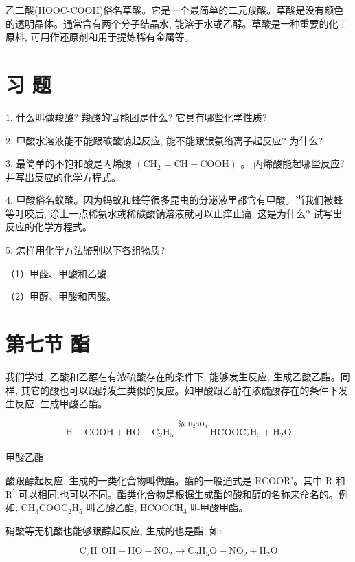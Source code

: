 \documentclass[10pt]{article}
\begin{document}
乙二酸(HOOC-COOH)俗名草酸。它是一个最简单的二元羧酸。草酸是没有颜色的透明晶体。通常含有两个分子结晶水, 能溶于水或乙醇。草酸是一种重要的化工原料, 可用作还原剂和用于提炼稀有金属等。

\section*{习 题}

1. 什么叫做羧酸? 羧酸的官能团是什么? 它具有哪些化学性质?

2. 甲酸水溶液能不能跟碳酸钠起反应, 能不能跟银氨络离子起反应? 为什么?

3. 最简单的不饱和酸是丙烯酸 \(\left( {{\mathrm{{CH}}}_{2} = \mathrm{{CH}} - \mathrm{{COOH}}}\right)\) 。 丙烯酸能起哪些反应? 并写出反应的化学方程式。

4. 甲酸俗名蚁酸。因为蚂蚁和蜂等很多昆虫的分泌液里都含有甲酸。当我们被蜂等叮咬后, 涂上一点稀氨水或稀碳酸钠溶液就可以止痒止痛, 这是为什么? 试写出反应的化学方程式。

5. 怎样用化学方法鉴别以下各组物质?

（1）甲醛、甲酸和乙酸,

（2）甲醇、甲酸和丙酸。

\section*{第七节 酯}

我们学过, 乙酸和乙醇在有浓硫酸存在的条件下, 能够发生反应, 生成乙酸乙酯。同样, 其它的酸也可以跟醇发生类似的反应。如甲酸跟乙醇在浓硫酸存在的条件下发生反应, 生成甲酸乙酯。

\[
\mathrm{H} - \mathrm{{COOH}} + \mathrm{{HO}} - {\mathrm{C}}_{2}{\mathrm{H}}_{5}\xrightarrow[]{\text{ 浓 }{\mathrm{H}}_{2}{\mathrm{{SO}}}_{4}}{\mathrm{{HCOOC}}}_{2}{\mathrm{H}}_{5} + {\mathrm{H}}_{2}\mathrm{O}
\]

甲酸乙酯

酸跟醇起反应, 生成的一类化合物叫做酯。酯的一般通式是 RCOOR'。其中 \(\mathrm{R}\) 和 \({\mathrm{R}}^{\prime }\) 可以相同,也可以不同。酯类化合物是根据生成酯的酸和醇的名称来命名的。例如, \({\mathrm{{CH}}}_{3}{\mathrm{{COOC}}}_{2}{\mathrm{H}}_{5}\) 叫乙酸乙酯, \({\mathrm{{HCOOCH}}}_{3}\) 叫甲酸甲酯。

硝酸等无机酸也能够跟醇起反应, 生成的也是酯, 如:

\[
{\mathrm{C}}_{2}{\mathrm{H}}_{5}\mathrm{{OH}} + \mathrm{{HO}} - {\mathrm{{NO}}}_{2} \rightarrow {\mathrm{C}}_{2}{\mathrm{H}}_{5}\mathrm{O} - {\mathrm{{NO}}}_{2} + {\mathrm{H}}_{2}\mathrm{O}
\]
\end{document}

